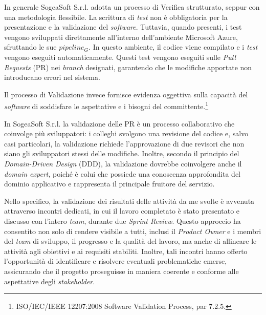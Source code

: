         \noindent In generale SogeaSoft S.r.l. adotta un processo di Verifica strutturato, seppur con una metodologia flessibile. La scrittura di \textit{test} non è obbligatoria per la presentazione e la validazione del \textit{software}. Tuttavia, quando presenti, i test vengono sviluppati direttamente all’interno dell'ambiente Microsoft Azure, sfruttando le sue \textit{$pipeline_G$}. In questo ambiente, il codice viene compilato e i \textit{test} vengono eseguiti automaticamente. Questi test vengono eseguiti sulle \textit{Pull Requests} (PR) nei \textit{branch} designati, garantendo che le modifiche apportate non introducano errori nel sistema. 

        \vspace{0.2 em}
        \noindent Il processo di Validazione invece fornisce evidenza oggettiva sulla capacità del \textit{software} di soddisfare le aspettative e i bisogni del committente.\footnote{ISO/IEC/IEEE 12207:2008 Software Validation Process, par 7.2.5.}

        \vspace{0.2 em}
        \noindent In SogeaSoft S.r.l. la validazione delle PR è un processo collaborativo che coinvolge più sviluppatori: i colleghi svolgono una revisione del codice e, salvo casi particolari, la validazione richiede l’approvazione di due revisori che non siano gli sviluppatori stessi delle modifiche. Inoltre, secondo il principio del \textit{Domain-Driven Design} (DDD), la validazione dovrebbe coinvolgere anche il \textit{domain expert}, poiché è colui che possiede una conoscenza approfondita del dominio applicativo e rappresenta il principale fruitore del servizio.

        \vspace{0.2 em}
        \noindent Nello specifico, la validazione dei risultati delle attività da me svolte è avvenuta attraverso incontri dedicati, in cui il lavoro completato è stato presentato e discusso con l'intero \textit{team}, durante due \textit{Sprint Review}. Questo approccio ha consentito non solo di rendere visibile a tutti, inclusi il \textit{Product Owner} e i membri del \textit{team} di sviluppo, il progresso e la qualità del lavoro, ma anche di allineare le attività agli obiettivi e ai requisiti stabiliti. Inoltre, tali incontri hanno offerto l'opportunità di identificare e risolvere eventuali problematiche emerse, assicurando che il progetto proseguisse in maniera coerente e conforme alle aspettative degli \textit{stakeholder}.
        
